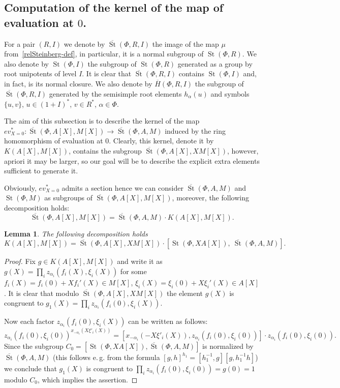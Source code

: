\documentclass[oneside, 8pt]{amsart}
\newtheorem{lemma}{Lemma}
\theoremstyle{remark}
\theoremstyle{definition}
\DeclareMathOperator{\St}{St}
\numberwithin{equation}{section}
\begin{document}
\subsection{Computation of the kernel of the map of evaluation at \texorpdfstring{$0$}{0}.}
For a pair $(R, I)$ we denote by $\overline{\St}(\Phi, R, I)$ the image of the map $\mu$ from~\eqref{relSteinberg-def}, in particular, it is a normal subgroup of $\St(\Phi, R)$.
We also denote by $\St(\Phi, I)$ the subgroup of $\St(\Phi, R)$ generated as a group by root unipotents of level $I$.
It is clear that $\overline{\St}(\Phi, R, I)$ contains $\St(\Phi, I)$ and, in fact, is its normal closure.
We also denote by $\overline{H}(\Phi, R, I)$ the subgroup of $\overline{\St}(\Phi, R, I)$ generated by the semisimple root elements $h_\alpha(u)$ and symbols $\{u, v\}$, $u \in (1+I)^*$, $v \in R^*$, $\alpha\in \Phi$.

The aim of this subsection is to describe the kernel of the map $ev_{X=0}^*\colon\overline{\St}(\Phi, A[X], M[X]) \to \overline{\St}(\Phi, A, M)$
induced by the ring homomorphism of evaluation at $0$. Clearly, this kernel, denote it by $K(A[X], M[X])$, contains the subgroup $\overline{\St}(\Phi, A[X], XM[X])$, however, apriori it may be larger, so our goal will be to describe the explicit extra elements sufficient to generate it.

Obviously, $ev_{X=0}^*$ admits a section hence we can consider $\overline{\St}(\Phi, A, M)$ and $\St(\Phi, M)$ as subgroups of $\overline{\St}(\Phi, A[X], M[X])$,
 moreover, the following decomposition holds:
\begin{equation} \label{relZero-decomp} \overline{\St}(\Phi, A[X], M[X]) = \overline{\St}(\Phi, A, M) \cdot K(A[X], M[X]).\end{equation}
\begin{lemma} The following decomposition holds
 \[ K(A[X], M[X]) = \overline{\St}(\Phi, A[X], XM[X]) \cdot \left[\St(\Phi, XA[X]),\ \overline{\St}(\Phi, A, M)\right].\] \end{lemma}
\begin{proof} Fix $g \in K(A[X], M[X])$ and write it as $g(X) = \prod_i z_{\alpha_i}(f_i(X), \xi_i(X))$ for some $f_i(X) = f_i(0) + Xf_i'(X) \in M[X]$, $\xi_i(X) = \xi_i(0) + X\xi_i'(X) \in A[X]$.
 It is clear that modulo $\overline{\St}(\Phi, A[X], XM[X])$ the element $g(X)$ is congruent to $g_1(X) = \prod_i z_{\alpha_i}(f_i(0), \xi_i(X)).$ 
 
 Now each factor $z_{\alpha_i}(f_i(0), \xi_i(X))$ can be written as follows:
 \[z_{\alpha_i}(f_i(0), \xi_i(0))^{x_{-\alpha_i}(X\xi'_i(X))} = [x_{-\alpha_i}(-X\xi'_i(X)), z_{\alpha_i}(f_i(0), \xi_i(0))] \cdot z_{\alpha_i}(f_i(0), \xi_i(0)).\]
 Since the subgroup $C_0 = \left[\St(\Phi, XA[X]), \overline{\St}(\Phi, A, M)\right]$ is normalized by $\overline{\St}(\Phi, A, M)$ 
 (this follows e.\,g. from the formula $[g, h]^{h_1} = [h_1^{-1}, g][g, h_1^{-1}h]$) we conclude that $g_1(X)$ is congruent to $\prod_i z_{\alpha_i}(f_i(0), \xi_i(0)) = g(0) = 1$ modulo $C_0$,
 which implies the assertion. \qedhere \end{proof}
\end{document}
